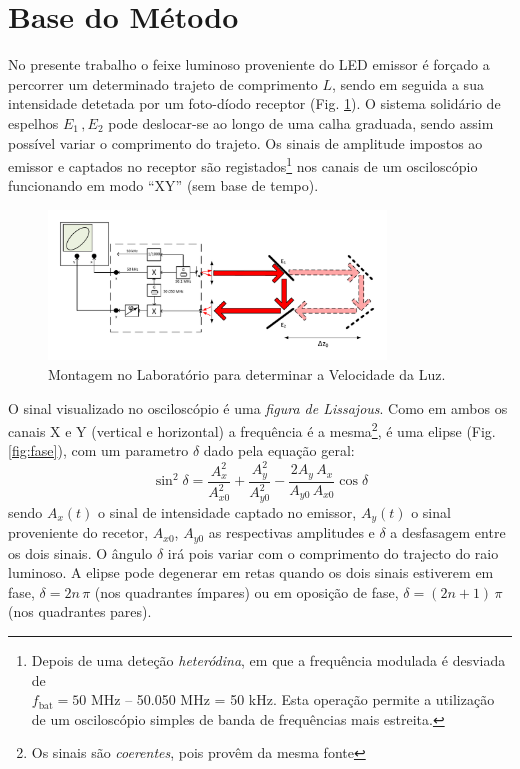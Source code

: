 \documentclass[a4paper,12pt]{article}      %
\begin{document}

\section{\sf Base do Método}
No presente trabalho o feixe luminoso proveniente do LED emissor
é forçado a percorrer um determinado trajeto de comprimento $L$, sendo em seguida a sua intensidade  detetada por um foto-díodo receptor (Fig. \ref{fig:Montagem}). O sistema solidário de espelhos $E_1\,, E_2$ pode deslocar-se ao longo de uma calha graduada,
sendo assim possível variar o comprimento do trajeto. Os
sinais de amplitude impostos ao emissor e captados no receptor são registados\footnote{Depois de uma deteção \emph{heteródina}, em que a frequência modulada é desviada de \\ 
$f_{\textrm{bat}}=50$ MHz -- 50.050 MHz = 50 kHz. Esta operação permite a utilização de um osciloscópio simples de banda de frequências mais estreita.} 
nos canais de um osciloscópio funcionando em modo “XY” (sem base de tempo).

\begin{figure}[htb] 
 \centering 
	\includegraphics[width=0.8\textwidth]{Vel_esquema}
	\caption{Montagem no Laboratório para determinar a Velocidade da Luz. \label{fig:Montagem}} 
\end{figure}


O sinal visualizado no osciloscópio é uma \emph{figura de Lissajous}. Como em ambos os canais X e Y (vertical e horizontal) a frequência é a 
mesma\footnote{Os sinais são \emph{coerentes}, pois provêm da mesma fonte}, é uma elipse (Fig. \ref{fig:fase}), com um parametro $\delta$ dado pela equação geral:
\begin{equation}
	\label{eq:elipse}
	\sin^2 \delta = \frac{A_x^2}{A_{x0}^2} + \frac{A_y^2}{A_{y0}^2} - \frac{2 A_y\,A_x}{A_{y0}\,A_{x0}} \cos  \delta
\end{equation}
sendo $A_x(t)$ o sinal de intensidade captado no emissor,  $A_y(t)$ o sinal
proveniente do recetor, $A_{x0}$, $A_{y0}$ as respectivas amplitudes e $\delta$ a desfasagem entre os dois sinais. O ângulo $\delta$ irá pois variar com o comprimento do trajecto do raio luminoso.  A elipse pode degenerar em retas quando os dois sinais estiverem
em fase, $\delta = 2n\,\pi$ (nos quadrantes ímpares)  ou em oposição de fase, $\delta = (2n+1)\,\pi$ (nos quadrantes pares). 
\end{document}
